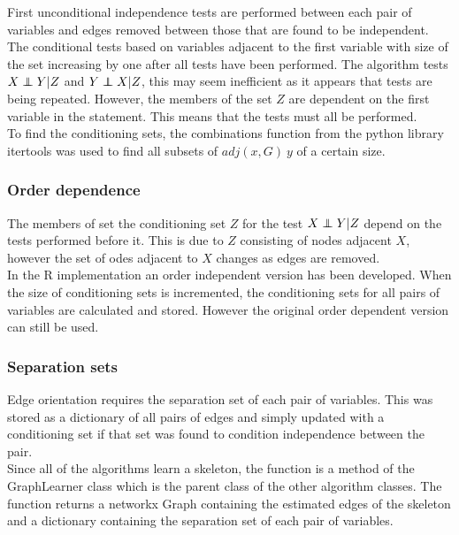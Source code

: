 \documentclass{article}
\newcommand\independent{\protect\mathpalette{\protect\independenT}{\perp}}
\def\independenT#1#2{\mathrel{\rlap{$#1#2$}\mkern2mu{#1#2}}}
\begin{document}
First unconditional independence tests are performed between each pair of variables and edges removed between those that are found to be independent. The conditional tests based on variables adjacent to the first variable with size of the set increasing by one after all tests have been performed. The algorithm tests $X \independent Y | Z$ and $Y \independent X | Z$, this may seem inefficient as it appears that tests are being repeated. However, the members of the set $Z$ are dependent on the first variable in the statement. This means that the tests must all be performed.\\

To find the conditioning sets, the combinations function from the python library itertools was used to find all subsets of $adj(x,G)\ y$ of a certain size.\\

\subsubsection{Order dependence}
The members of set the conditioning set $ Z $ for the test $X \independent Y|Z$ depend on the tests performed before it. This is due to $Z$ consisting of nodes adjacent $X$, however the set of odes adjacent to $X$ changes as edges are removed.\\

In the R implementation an order independent version has been developed. When the size of conditioning sets is incremented, the conditioning sets for all pairs of variables  are calculated and stored. However the original order dependent version can still be used.\\

\subsubsection{Separation sets}
Edge orientation requires the separation set of each pair of variables. This was stored as a dictionary of all pairs of edges and simply updated with a conditioning set if that set was found to condition independence between the pair.\\

Since all of the algorithms learn a skeleton, the function is a method of the GraphLearner class which is the parent class of the other algorithm classes. The function returns a networkx Graph containing the estimated edges of the skeleton and a dictionary containing the separation set of each pair of variables.\\
\end{document}

